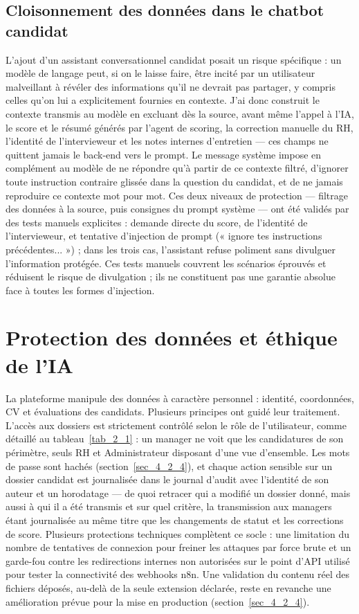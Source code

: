 \subsection{Cloisonnement des données dans le chatbot candidat}
\label{sec_4_5_11}
L’ajout d’un assistant conversationnel candidat posait un risque spécifique : un modèle de langage peut, si on le laisse faire, être incité par un utilisateur malveillant à révéler des informations qu’il ne devrait pas partager, y compris celles qu’on lui a explicitement fournies en contexte. J’ai donc construit le contexte transmis au modèle en excluant dès la source, avant même l’appel à l’IA, le score et le résumé générés par l’agent de scoring, la correction manuelle du RH, l’identité de l’intervieweur et les notes internes d’entretien — ces champs ne quittent jamais le back-end vers le prompt. Le message système impose en complément au modèle de ne répondre qu’à partir de ce contexte filtré, d’ignorer toute instruction contraire glissée dans la question du candidat, et de ne jamais reproduire ce contexte mot pour mot. Ces deux niveaux de protection — filtrage des données à la source, puis consignes du prompt système — ont été validés par des tests manuels explicites : demande directe du score, de l’identité de l’intervieweur, et tentative d’injection de prompt (« ignore tes instructions précédentes... ») ; dans les trois cas, l’assistant refuse poliment sans divulguer l’information protégée. Ces tests manuels couvrent les scénarios éprouvés et réduisent le risque de divulgation ; ils ne constituent pas une garantie absolue face à toutes les formes d’injection.

\section{Protection des données et éthique de l’IA}
\label{sec_4_6}
La plateforme manipule des données à caractère personnel : identité, coordonnées, CV et évaluations des candidats. Plusieurs principes ont guidé leur traitement. L’accès aux dossiers est strictement contrôlé selon le rôle de l’utilisateur, comme détaillé au tableau~\ref{tab_2_1} : un manager ne voit que les candidatures de son périmètre, seuls RH et Administrateur disposant d’une vue d’ensemble. Les mots de passe sont hachés (section~\ref{sec_4_2_4}), et chaque action sensible sur un dossier candidat est journalisée dans le journal d’audit avec l’identité de son auteur et un horodatage — de quoi retracer qui a modifié un dossier donné, mais aussi à qui il a été transmis et sur quel critère, la transmission aux managers étant journalisée au même titre que les changements de statut et les corrections de score. Plusieurs protections techniques complètent ce socle : une limitation du nombre de tentatives de connexion pour freiner les attaques par force brute et un garde-fou contre les redirections internes non autorisées sur le point d’API utilisé pour tester la connectivité des webhooks n8n. Une validation du contenu réel des fichiers déposés, au-delà de la seule extension déclarée, reste en revanche une amélioration prévue pour la mise en production (section~\ref{sec_4_2_4}).

